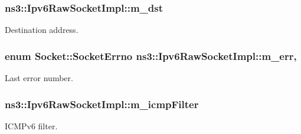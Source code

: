 \subsubsection[{\texorpdfstring{m\+\_\+dst}{m_dst}}]{ ns3\+::\+Ipv6\+Raw\+Socket\+Impl\+::m\+\_\+dst\hspace{0.3cm}{\ttfamily [private]}}\hypertarget{classns3_1_1Ipv6RawSocketImpl_ac1bd7e150da6118befd78831b483c0ca}{}\label{classns3_1_1Ipv6RawSocketImpl_ac1bd7e150da6118befd78831b483c0ca}


Destination address. 

\subsubsection[{\texorpdfstring{m\+\_\+err}{m_err}}]{\setlength{\rightskip}{0pt plus 5cm}enum {\bf Socket\+::\+Socket\+Errno} ns3\+::\+Ipv6\+Raw\+Socket\+Impl\+::m\+\_\+err\hspace{0.3cm}{\ttfamily [mutable]}, {\ttfamily [private]}}\hypertarget{classns3_1_1Ipv6RawSocketImpl_afabd1db84eac91197faac4f4852d8681}{}\label{classns3_1_1Ipv6RawSocketImpl_afabd1db84eac91197faac4f4852d8681}


Last error number. 

\subsubsection[{\texorpdfstring{m\+\_\+icmp\+Filter}{m_icmpFilter}}]{ ns3\+::\+Ipv6\+Raw\+Socket\+Impl\+::m\+\_\+icmp\+Filter\hspace{0.3cm}{\ttfamily [private]}}\hypertarget{classns3_1_1Ipv6RawSocketImpl_a38df054d5b81d3d1d29543fff42f44bb}{}\label{classns3_1_1Ipv6RawSocketImpl_a38df054d5b81d3d1d29543fff42f44bb}


I\+C\+M\+Pv6 filter. 

